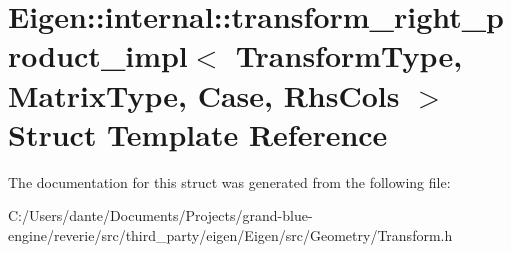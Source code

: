 \hypertarget{struct_eigen_1_1internal_1_1transform__right__product__impl}{}\section{Eigen\+::internal\+::transform\+\_\+right\+\_\+product\+\_\+impl$<$ Transform\+Type, Matrix\+Type, Case, Rhs\+Cols $>$ Struct Template Reference}
\label{struct_eigen_1_1internal_1_1transform__right__product__impl}


The documentation for this struct was generated from the following file\+:\begin{DoxyCompactItemize}
\item 
C\+:/\+Users/dante/\+Documents/\+Projects/grand-\/blue-\/engine/reverie/src/third\+\_\+party/eigen/\+Eigen/src/\+Geometry/Transform.\+h\end{DoxyCompactItemize}
